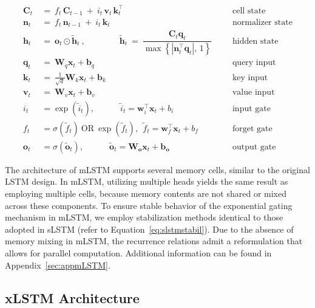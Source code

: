 \begin{align}
\label{eq:mlstm_recurrent_begin}
\mathbf{C}_t \ &= \ f_t \, \mathbf{C}_{t-1} \ + \ 
  i_t \, \mathbf{v}_t \, \mathbf{k}_t^\top & & &\text{cell state} \\
\mathbf{n}_t \ &= \ f_t \, \mathbf{n}_{t-1} \ + \
  i_t \, \mathbf{k}_t & & &\text{normalizer state} \\
\mathbf{h}_t &= \ \mathbf{o}_t \odot \tilde{\mathbf{h}}_t
\ , \qquad \qquad 
\tilde{\mathbf{h}}_t \ = \ \dfrac{\mathbf{C}_t \mathbf{q}_t}{
  \max \left\{ |\mathbf{n}_t^\top \mathbf{q}_t|,\, 1 \right\} }
  &&&\text{hidden state} \\
\mathbf{q}_t \ &= \ \mathbf{W}_q \mathbf{x}_t + \mathbf{b}_q & & &\text{query input} \\
\mathbf{k}_t \ &= \ \frac{1}{\sqrt{d}} \mathbf{W}_k \mathbf{x}_t + \mathbf{b}_k & & &\text{key input} \\
\mathbf{v}_t \ &= \ \mathbf{W}_v \mathbf{x}_t + \mathbf{b}_v & & &\text{value input} \\
i_t \ &= \exp\!\left(\tilde{i}_t\right),  \qquad \quad \tilde{i}_t = \mathbf{w}_i^\top \mathbf{x}_t + b_i
  &&&\text{input gate} \\
f_t \ &= \sigma(\tilde{f}_t) \ \text{OR} \ \exp(\tilde{f}_t),\ \ 
\tilde{f}_t = \mathbf{w}_f^\top \mathbf{x}_t + b_f
  &&&\text{forget gate} \\
\label{eq:mlstm_recurrent_end}
\mathbf{o}_t &= \sigma(\tilde{\mathbf{o}}_t), \qquad \quad \tilde{\mathbf{o}}_t = \mathbf{W}_{\mathbf{o}} \mathbf{x}_t + \mathbf{b}_{\mathbf{o}}
  &&&\text{output gate} 
\end{align}

The architecture of mLSTM supports several memory cells, similar to the original LSTM design. In mLSTM, utilizing multiple heads yields the same result as employing multiple cells, because memory contents are not shared or mixed across these components. To ensure stable behavior of the exponential gating mechanism in mLSTM, we employ stabilization methods identical to those adopted in sLSTM (refer to Equation~\ref{eq:slstmstabil}). Due to the absence of memory mixing in mLSTM, the recurrence relations admit a reformulation that allows for parallel computation. Additional information can be found in Appendix~\ref{sec:appmLSTM}.

\subsection{xLSTM Architecture}
\label{sec:xLSTMarch}

